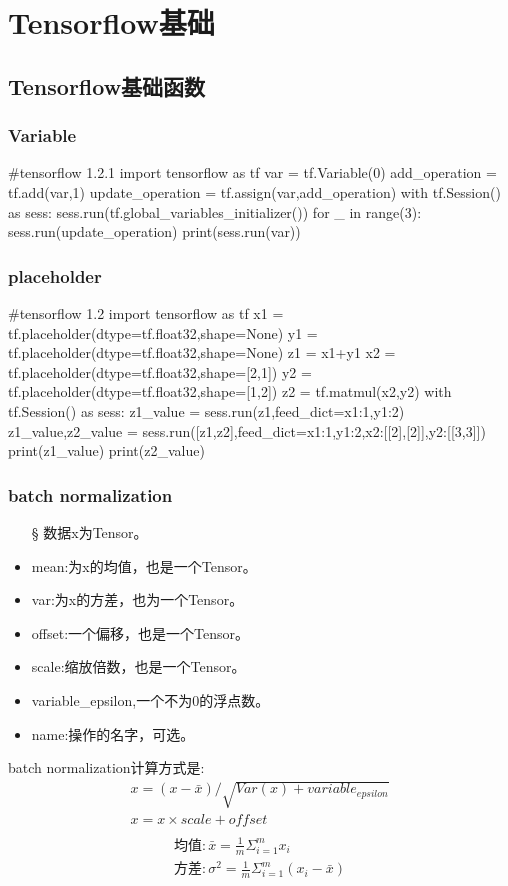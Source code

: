 \chapter{Tensorflow基础}
\section{Tensorflow基础函数}
\subsection{Variable}
\begin{python}
#tensorflow 1.2.1
import tensorflow as tf
var = tf.Variable(0)
add_operation = tf.add(var,1)
update_operation = tf.assign(var,add_operation)
with tf.Session() as sess:
    sess.run(tf.global_variables_initializer())
    for _ in range(3):
        sess.run(update_operation)
        print(sess.run(var))
\end{python}
\subsection{placeholder}
\begin{python}
#tensorflow 1.2
import tensorflow as tf
x1 = tf.placeholder(dtype=tf.float32,shape=None)
y1 = tf.placeholder(dtype=tf.float32,shape=None)
z1 = x1+y1
x2 = tf.placeholder(dtype=tf.float32,shape=[2,1])
y2 = tf.placeholder(dtype=tf.float32,shape=[1,2])
z2 = tf.matmul(x2,y2)
with tf.Session() as sess:
    z1_value = sess.run(z1,feed_dict={x1:1,y1:2})
    z1_value,z2_value = sess.run([z1,z2],feed_dict={x1:1,y1:2,x2:[[2],[2]],y2:[[3,3]]})
    print(z1_value)
    print(z2_value)
\end{python}
\subsection{batch normalization}

\begin{itemize}
	\item[\S] 数据x为Tensor。
\item mean:为x的均值，也是一个Tensor。
\item var:为x的方差，也为一个Tensor。
\item offset:一个偏移，也是一个Tensor。
\item scale:缩放倍数，也是一个Tensor。
\item variable\_epsilon,一个不为0的浮点数。
\item name:操作的名字，可选。
\end{itemize}
batch normalization计算方式是:
\begin{gather}
x = (x-\bar{x})/\sqrt{Var(x)+variable_{epsilon}}\\
x = x\times scale+offset\\
\end{gather}
\begin{gather}
\text{均值}:\bar{x} = \frac{1}{m}\Sigma_{i=1}^{m}x_i\\
\text{方差}:\sigma^2 = \frac{1}{m}\Sigma_{i=1}^m(x_i-\bar{x})
\end{gather}
